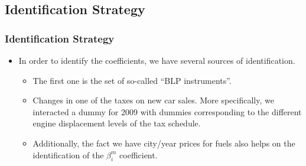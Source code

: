\documentclass{beamer}
\begin{document}
\subsection{Identification Strategy}
\begin{frame}[fragile]\frametitle{Identification Strategy}
\begin{itemize}
    \item In order to identify the coefficients, we have several sources of identification. 
    \begin{itemize}
        \item The first one is the set of so-called ``BLP instruments''.
        \item Changes in one of the taxes on new car sales. More specifically, we interacted a dummy for 2009 with dummies corresponding to the different engine displacement levels of the tax schedule.
        \item Additionally, the fact we have city/year prices for fuels also helps on the identification of the $\beta_{i}^{m}$ coefficient.
    \end{itemize}

\end{itemize}
 
\end{frame}
\end{document}

